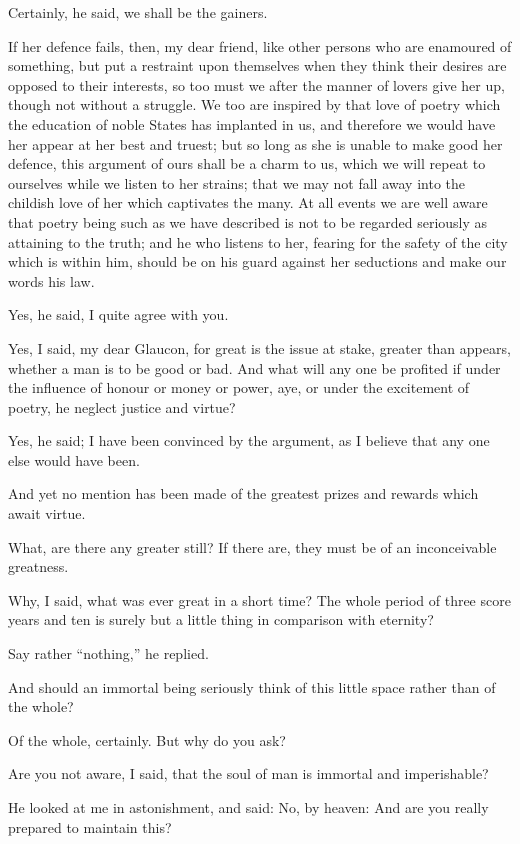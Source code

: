 Certainly, he said, we shall be the gainers.

If her defence fails, then, my dear friend, like other persons who are
enamoured of something, but put a restraint upon themselves when they
think their desires are opposed to their interests, so too must we after
the manner of lovers give her up, though not without a struggle. We too
are inspired by that love of poetry which the education of noble States
has implanted in us, and therefore we would have her appear at her best
and truest; but so long as she is unable to make good her defence,
this argument of ours shall be a charm to us, which we will repeat to
ourselves while we listen to her strains; that we may not fall away into
the childish love of her which captivates the many. At all events we
are well aware that poetry being such as we have described is not to be
regarded seriously as attaining to the truth; and he who listens to her,
fearing for the safety of the city which is within him, should be on his
guard against her seductions and make our words his law.

Yes, he said, I quite agree with you.

Yes, I said, my dear Glaucon, for great is the issue at stake, greater
than appears, whether a man is to be good or bad. And what will any one
be profited if under the influence of honour or money or power, aye, or
under the excitement of poetry, he neglect justice and virtue?

Yes, he said; I have been convinced by the argument, as I believe that
any one else would have been.

And yet no mention has been made of the greatest prizes and rewards
which await virtue.

What, are there any greater still? If there are, they must be of an
inconceivable greatness.

Why, I said, what was ever great in a short time? The whole period of
three score years and ten is surely but a little thing in comparison
with eternity?

Say rather ``nothing,'' he replied.

And should an immortal being seriously think of this little space rather
than of the whole?

Of the whole, certainly. But why do you ask?

Are you not aware, I said, that the soul of man is immortal and
imperishable?

He looked at me in astonishment, and said: No, by heaven: And are you
really prepared to maintain this?

